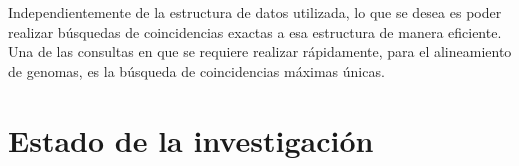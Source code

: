 \documentclass[12pt,a4paper]{article}
\begin{document}
\indent
Independientemente de la estructura de datos utilizada, lo que se desea es poder realizar búsquedas de coincidencias exactas a esa estructura de manera eficiente. 
Una de las consultas en que se requiere realizar rápidamente, para el alineamiento de genomas, es la búsqueda de coincidencias máximas únicas. 
\section{Estado de la investigación}
\end{document}
